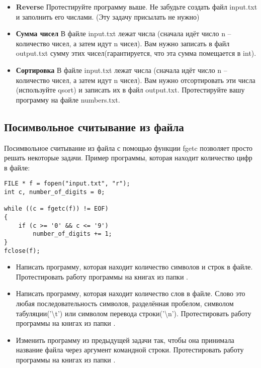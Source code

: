 \documentclass{article}
\begin{document}
\begin{itemize}
\item \textbf{Reverse} Протестируйте программу выше. Не забудьте создать файл input.txt и заполнить его числами. (Эту задачу присылать не нужно)
\item \textbf{Сумма чисел} В файле input.txt лежат числа (сначала идёт число n -- количество чисел, а затем идут n чисел). Вам нужно записать в файл output.txt сумму этих чисел(гарантируется, что эта сумма помещается в int).
\item \textbf{Сортировка} В файле input.txt лежат числа (сначала идёт число n -- количество чисел, а затем идут n чисел). Вам нужно отсортировать эти числа (используйте qsort) и записать их в файл output.txt. Протестируйте вашу программу на файле numbers.txt.
\end{itemize}

\newpage

\subsection*{Посимвольное считывание из файла}
Посимвольное считывание из файла с помощью функции fgetc позволяет просто решать некоторые задачи. Пример программы, которая находит количество цифр в файле:
\begin{lstlisting}
FILE * f = fopen("input.txt", "r");
int c, number_of_digits = 0;

while ((c = fgetc(f)) != EOF)
{
    if (c >= '0' && c <= '9')
        number_of_digits += 1;
}
fclose(f);
\end{lstlisting}
\begin{itemize}
\item Написать программу, которая находит количество символов и строк в файле. Протестировать работу программы на книгах из папки .

\item Написать программу, которая находит количество слов в файле. Слово это любая последовательность символов, разделённая пробелом, символом табуляции('\textbackslash t') или символом перевода строки('\textbackslash n'). Протестировать работу программы на книгах из папки .

\item Изменить программу из предыдущей задачи так, чтобы она принимала название файла через аргумент командной строки. Протестировать работу программы на книгах из папки .
\end{itemize}
\end{document}

